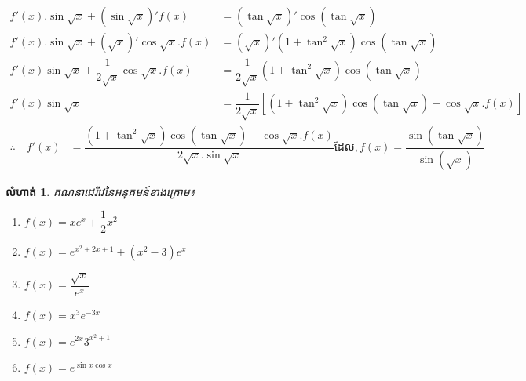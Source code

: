 \documentclass[12pt,fleqn]{book} %
\newtheorem{exercise}{\kml លំហាត់}
\begin{document}
\begin{enumerate}
\begin{align*}
f'(x).\sin \sqrt{x}+(\sin \sqrt{x})'f(x)&=(\tan \sqrt{x})'\cos (\tan \sqrt{x})\\
f'(x).\sin \sqrt{x} +(\sqrt{x})'\cos \sqrt{x}.f(x)&=(\sqrt{x})'(1+\tan^2 \sqrt{x})\cos (\tan \sqrt{x})\\
f'(x)\sin \sqrt{x}+\dfrac{1}{2\sqrt{x}}\cos \sqrt{x}.f(x)&=\dfrac{1}{2\sqrt{x}}(1+\tan^2 \sqrt{x})\cos (\tan \sqrt{x}) \\
f'(x)\sin \sqrt{x} &=\dfrac{1}{2\sqrt{x}}\left[(1+\tan^2 \sqrt{x})\cos (\tan \sqrt{x})-\cos \sqrt{x}.f(x)  \right]
\end{align*}
\begin{align*}
\therefore \quad f'(x)&=\dfrac{(1+\tan^2 \sqrt{x})\cos (\tan \sqrt{x})-\cos \sqrt{x}.f(x)}{2\sqrt{x}.\sin \sqrt{x}} \text{ដែល} ,f(x)=\dfrac{\sin (\tan \sqrt{x})}{\sin (\sqrt{x})}
\end{align*}
\end{enumerate}
\begin{exercise}
គណនាដេរីវេនៃអនុគមន៍ខាងក្រោម៖
\begin{multicols}{2}
\begin{enumerate}
\item $f(x)=xe^x +\dfrac{1}{2}x^2$
\item $f(x)=e^{x^2+2x+1}+(x^2-3)e^x$
\item $f(x)=\dfrac{\sqrt{x}}{e^x}$
\item $f(x)=x^3 e^{-3x}$
\item $f(x)=e^{2x}3^{x^2+1}$
\item $f(x)=e^{\sin x\cos x}$
\end{enumerate}
\end{multicols}
\end{exercise}
\end{document}
